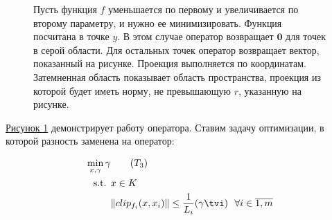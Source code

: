\begin{figure}[!]
\begin{center}    
 \resizebox{0.5\textwidth}{!}{

    } 
        \caption{Пусть функция $f$ уменьшается по первому и увеличивается по второму параметру, и нужно ее минимизировать. Функция посчитана в точке $y$. В этом случае оператор возвращает $\textbf{0}$ для точек в серой области. Для остальных точек оператор возвращает вектор, показанный на рисунке. Проекция выполняется по координатам. Затемненная область показывает область пространства, проекция из которой будет иметь норму, не превышающую $r$, указанную на рисунке.}
\end{center}
\label{fig:clip_demo}
\end{figure}

\hyperref[fig:clip_demo]{Рисунок 1} демонстрирует работу оператора.
Ставим задачу оптимизации, в которой разность заменена на оператор:

    \begin{align*}
    \min_{x, \gamma} \gamma & \tag{$T_3$}\label{opt:T3} \\
    \text{s.t. } &x \in K \\
                 &\|clip_{f_i}(x,x_i)\| \leq \frac{1}{L_i}(\gamma \tvi) ~~ \forall i\in\overline{1,m}
    \end{align*}


